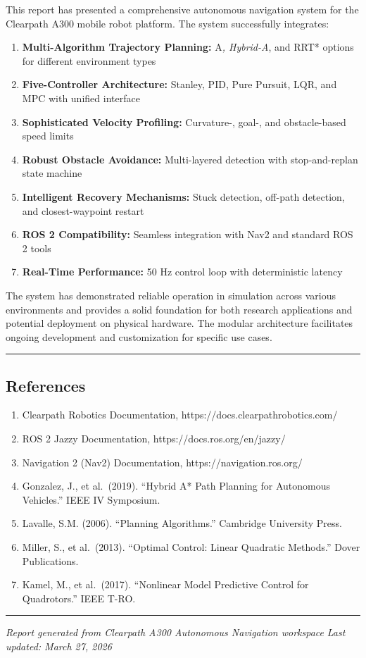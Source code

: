 This report has presented a comprehensive autonomous navigation system
for the Clearpath A300 mobile robot platform. The system successfully
integrates:

\begin{enumerate}
\def\labelenumi{\arabic{enumi}.}
\tightlist
\item
  \textbf{Multi-Algorithm Trajectory Planning:} A\emph{, Hybrid-A}, and
  RRT* options for different environment types
\item
  \textbf{Five-Controller Architecture:} Stanley, PID, Pure Pursuit,
  LQR, and MPC with unified interface
\item
  \textbf{Sophisticated Velocity Profiling:} Curvature-, goal-, and
  obstacle-based speed limits
\item
  \textbf{Robust Obstacle Avoidance:} Multi-layered detection with
  stop-and-replan state machine
\item
  \textbf{Intelligent Recovery Mechanisms:} Stuck detection, off-path
  detection, and closest-waypoint restart
\item
  \textbf{ROS 2 Compatibility:} Seamless integration with Nav2 and
  standard ROS 2 tools
\item
  \textbf{Real-Time Performance:} 50 Hz control loop with deterministic
  latency
\end{enumerate}

The system has demonstrated reliable operation in simulation across
various environments and provides a solid foundation for both research
applications and potential deployment on physical hardware. The modular
architecture facilitates ongoing development and customization for
specific use cases.

\begin{center}\rule{0.5\linewidth}{0.5pt}\end{center}

\hypertarget{references}{%
\subsection{References}\label{references}}

\begin{enumerate}
\def\labelenumi{\arabic{enumi}.}
\tightlist
\item
  Clearpath Robotics Documentation, https://docs.clearpathrobotics.com/
\item
  ROS 2 Jazzy Documentation, https://docs.ros.org/en/jazzy/
\item
  Navigation 2 (Nav2) Documentation, https://navigation.ros.org/
\item
  Gonzalez, J., et al.~(2019). ``Hybrid A* Path Planning for Autonomous
  Vehicles.'' IEEE IV Symposium.
\item
  Lavalle, S.M. (2006). ``Planning Algorithms.'' Cambridge University
  Press.
\item
  Miller, S., et al.~(2013). ``Optimal Control: Linear Quadratic
  Methods.'' Dover Publications.
\item
  Kamel, M., et al.~(2017). ``Nonlinear Model Predictive Control for
  Quadrotors.'' IEEE T-RO.
\end{enumerate}

\begin{center}\rule{0.5\linewidth}{0.5pt}\end{center}

\emph{Report generated from Clearpath A300 Autonomous Navigation
workspace} \emph{Last updated: March 27, 2026}
